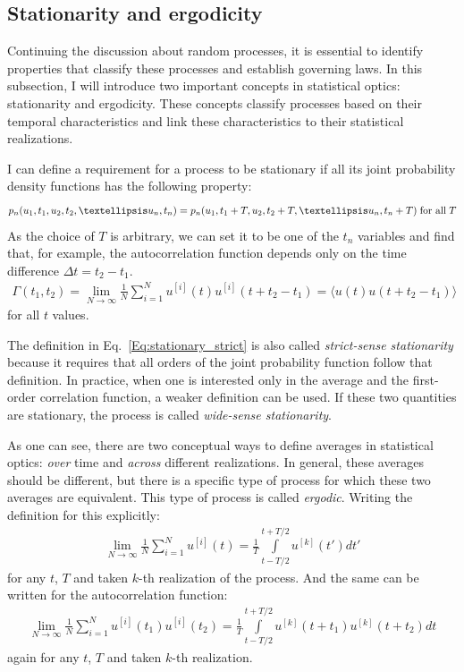     \subsection{Stationarity and ergodicity}
    
    Continuing the discussion about random processes, it is essential to identify properties that classify these processes and establish governing laws. In this subsection, I will introduce two important concepts in statistical optics: stationarity and ergodicity. These concepts classify processes based on their temporal characteristics and link these characteristics to their statistical realizations.

    I can define a requirement for a process to be stationary if all its joint probability density functions has the following property:
    \begin{align}
        p_n(u_1, t_1, u_2, t_2, …u_n, t_n) = p_n(u_1, t_1 + T, u_2, t_2 + T, …u_n, t_n + T) \; \textup{for all} \; T
        \label{Eq:stationary_strict}
    \end{align}
    As the choice of $T$ is arbitrary, we can set it to be one of the $t_n$ variables and find that, for example, the autocorrelation function depends only on the time difference $\Delta t = t_2 - t_1$.
    \begin{align}
        \Gamma(t_1, t_2) = \lim_{N\to\infty} \frac{1}{N}\sum_{i=1}^{N} u^{[i]}(t)u^{[i]}(t + t_2 - t_1) = \langle u(t)u(t + t_2 - t_1) \rangle
    \end{align}
    for all $t$ values.

    
    The definition in Eq.~\ref{Eq:stationary_strict} is also called \textit{strict-sense stationarity} because it requires that all orders of the joint probability function follow that definition. In practice, when one is interested only in the average and the first-order correlation function, a weaker definition can be used. If these two quantities are stationary, the process is called \textit{wide-sense stationarity}.

    As one can see, there are two conceptual ways to define averages in statistical optics: \textit{over} time and \textit{across} different realizations. In general, these averages should be different, but there is a specific type of process for which these two averages are equivalent. This type of process is called \textit{ergodic}. Writing the definition for this explicitly:
    \begin{align}
        \lim_{N\to\infty} \frac{1}{N}\sum_{i=1}^{N} u^{[i]}(t) = \frac{1}{T} \int \limits_{t - T/2}^{t + T/2}  u^{[k]}(t') dt'
    \end{align} 
    for any $t$, $T$ and taken $k$-th realization of the process. And the same can be written for the autocorrelation function:
    \begin{align}
        \lim_{N\to\infty} \frac{1}{N}\sum_{i=1}^{N} u^{[i]}(t_1)u^{[i]}(t_2) = \frac{1}{T} \int \limits_{t - T/2}^{t + T/2} u^{[k]}(t + t_1)u^{[k]}(t + t_2)dt
        \label{Eq:ergodic_corr}
    \end{align}
    again for any $t$, $T$ and taken $k$-th realization. 

